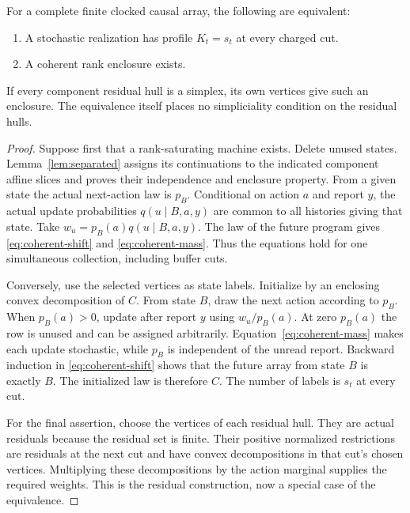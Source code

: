 \begin{theorem}
\label{thm:coherence}
For a complete finite clocked causal array, the following are equivalent:
\begin{enumerate}
\item A stochastic realization has profile $K_t=s_t$ at every charged cut.
\item A coherent rank enclosure exists.
\end{enumerate}
If every component residual hull is a simplex, its own vertices give
such an enclosure. The equivalence itself places no simpliciality
condition on the residual hulls.
\end{theorem}
\begin{proof}
Suppose first that a rank-saturating machine exists. Delete unused states.
Lemma~\ref{lem:separated} assigns its continuations to the indicated
component affine slices and proves their independence and enclosure
property. From a given state the actual next-action law is $p_B$.
Conditional on action $a$ and report $y$, the actual update probabilities
$q(u\mid B,a,y)$ are common to all histories giving that state.
Take $w_u=p_B(a)q(u\mid B,a,y)$. The law of the future program gives
\eqref{eq:coherent-shift} and \eqref{eq:coherent-mass}. Thus the
equations hold for one simultaneous collection, including buffer cuts.

Conversely, use the selected vertices as state labels. Initialize by
an enclosing convex decomposition of $C$. From state $B$, draw the
next action according to $p_B$. When $p_B(a)>0$, update after report
$y$ using $w_u/p_B(a)$. At zero $p_B(a)$ the row is unused and can
be assigned arbitrarily. Equation~\eqref{eq:coherent-mass} makes each
update stochastic, while $p_B$ is independent of the unread report.
Backward induction in \eqref{eq:coherent-shift} shows that the future
array from state $B$ is exactly $B$. The initialized law is therefore
$C$. The number of labels is $s_t$ at every cut.

For the final assertion, choose the vertices of each residual hull.
They are actual residuals because the residual set is finite. Their
positive normalized restrictions are residuals at the next cut and
have convex decompositions in that cut's chosen vertices. Multiplying
these decompositions by the action marginal supplies the required
weights. This is the residual construction, now a special case of
the equivalence.
\end{proof}

